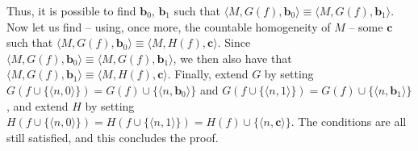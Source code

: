 \documentclass{article}
\theoremstyle{definition}
\newcommand{\tuple}{\mathbf}
\begin{document}
\begin{itemize}
			Thus, it is possible to find $\tuple b_0$, $\tuple b_1$ such that $\langle M, G(f), \tuple b_0\rangle \equiv \langle M, G(f), \tuple b_1\rangle$.\\

			Now let us find -- using, once more, the countable homogeneity of $M$ -- some $\tuple c$ such that $\langle M, G(f), \tuple b_0\rangle \equiv \langle M, H(f), \tuple c\rangle$. Since $\langle M, G(f), \tuple b_0\rangle \equiv \langle M, G(f), \tuple b_1\rangle$, we then also have that $\langle M, G(f), \tuple b_1\rangle \equiv \langle M, H(f), \tuple c\rangle$. Finally, extend $G$ by setting $G(f \cup \{\langle n, 0\rangle\}) = G(f) \cup \{\langle n, \tuple b_0\rangle\}$ and $G(f \cup \{\langle n, 1\rangle\}) = G(f) \cup \{\langle n, \tuple b_1\rangle\}$, and extend $H$ by setting $H(f \cup \{\langle n, 0\rangle\}) = H(f \cup \{\langle n,1\rangle\}) = H(f) \cup \{\langle n, \tuple c\rangle\}$. The conditions are all still satisfied, and this concludes the proof. 
	\end{itemize}
\end{document}
